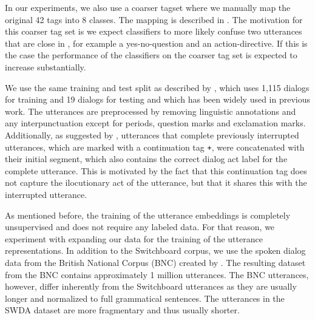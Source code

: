 In our experiments, we also use a coarser tagset where we manually map the original 42 tags into 8 classes. The mapping is described in . The motivation for this coarser tag set is we expect classifiers to more likely confuse two utterances that are close in , for example a yes-no-question and an action-directive. If this is the case the performance of the classifiers on the coarser tag set is expected to increase substantially.

We use the same training and test split as described by , which uses 1,115 dialogs for training and 19 dialogs for testing and which has been widely used in previous work. 
The utterances are preprocessed by removing linguistic annotations and any interpunctuation except for periods, question marks and exclamation marks.
Additionally, as suggested by , utterances that complete previously interrupted utterances, which are marked with a continuation tag \texttt{+}, were concatenated with their initial segment, which also contains the correct dialog act label for the complete utterance. This is motivated by the fact that this continuation tag does not capture the ilocutionary act of the utterance, but that it shares this with the interrupted utterance.

As mentioned before, the training of the utterance embeddings is completely unsupervised and does not require any labeled data.
For that reason, we experiment with expanding our data for the training of the utterance representations.
In addition to the Switchboard corpus, we use the spoken dialog data from the British National Corpus (BNC) created by .
The resulting dataset from the BNC contains approximately 1 million utterances. 
The BNC utterances, however, differ inherently from the Switchboard utterances as they are usually longer and normalized to full grammatical sentences.
The utterances in the SWDA dataset are more fragmentary and thus usually shorter.



